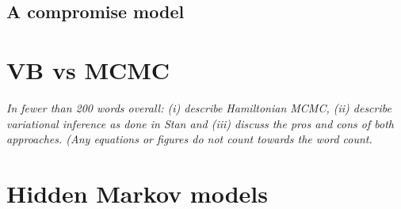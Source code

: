 \documentclass[11pt,a4paper]{article}
\begin{document}
  \subsection{A compromise model}

\section{VB vs MCMC}

\textit{In fewer than 200 words overall: (i) describe Hamiltonian MCMC, (ii) describe variational inference as done in Stan and (iii) discuss the pros and cons of both approaches. (Any equations or figures do not count towards the word count.}

\section{Hidden Markov models}
\end{document}
